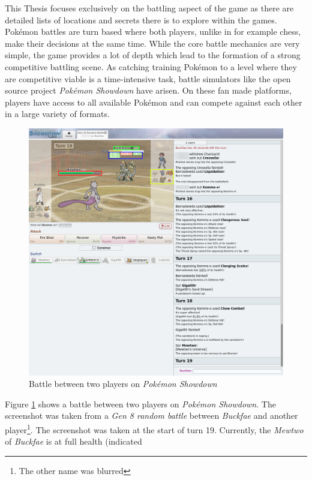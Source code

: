 This Thesis focuses exclusively on the battling aspect of the game as there are detailed lists of locations and
secrets there is to explore within the games. Pokémon battles are turn based where both players, unlike in 
for example chess, make their decisions at the same time. While the core battle mechanics are very simple, 
the game provides a lot of depth which lead to the formation of a strong competitive battling scene.
As catching training Pokémon to a level where they are competitive viable is a time-intensive task, battle
simulators like  the open source project \textit{Pokémon Showdown}  have arisen. On these fan made
platforms, players have access to all available Pokémon and can compete against each other in a large variety
of formats.
\begin{figure}
  \centering
  \includegraphics[width=1\textwidth]{images/Showdown.png}
  \caption{Battle between two players on \textit{Pokémon Showdown}}
  \label{fig:showdown-battle}
\end{figure}
Figure \ref{fig:showdown-battle}  shows a battle between two players on 
\textit{Pokémon Showdown}. The screenshot was taken from a \textit{Gen 8 random battle} between 
\textit{Buckfae} and another player\footnote{The other name was blurred}. The screenshot was taken
at the start of turn 19. Currently, the \textit{Mewtwo} of \textit{Buckfae} is at full health (indicated

